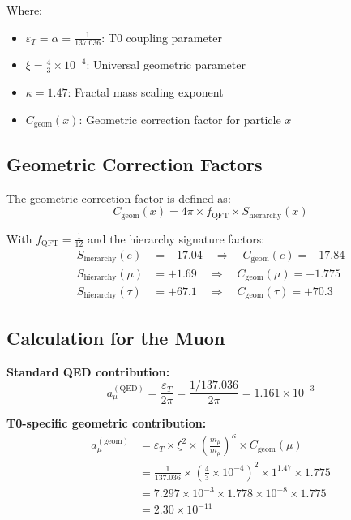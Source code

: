 \documentclass[12pt,a4paper]{article}
\begin{document}
Where:
\begin{itemize}
	\item $\varepsilon_T = \alpha = \frac{1}{137.036}$: T0 coupling parameter
	\item $\xi = \frac{4}{3} \times 10^{-4}$: Universal geometric parameter
	\item $\kappa = 1.47$: Fractal mass scaling exponent
	\item $C_{\text{geom}}(x)$: Geometric correction factor for particle $x$
\end{itemize}

\subsection{Geometric Correction Factors}

The geometric correction factor is defined as:
\begin{equation}
	C_{\text{geom}}(x) = 4\pi \times f_{\text{QFT}} \times S_{\text{hierarchy}}(x)
\end{equation}

With $f_{\text{QFT}} = \frac{1}{12}$ and the hierarchy signature factors:
\begin{align}
	S_{\text{hierarchy}}(e) &= -17.04 \quad \Rightarrow \quad C_{\text{geom}}(e) = -17.84\\
	S_{\text{hierarchy}}(\mu) &= +1.69 \quad \Rightarrow \quad C_{\text{geom}}(\mu) = +1.775\\
	S_{\text{hierarchy}}(\tau) &= +67.1 \quad \Rightarrow \quad C_{\text{geom}}(\tau) = +70.3
\end{align}

\subsection{Calculation for the Muon}

\textbf{Standard QED contribution:}
\begin{equation}
	a_\mu^{(\text{QED})} = \frac{\varepsilon_T}{2\pi} = \frac{1/137.036}{2\pi} = 1.161 \times 10^{-3}
\end{equation}

\textbf{T0-specific geometric contribution:}
\begin{align}
	a_\mu^{(\text{geom})} &= \varepsilon_T \times \xi^2 \times \left(\frac{m_\mu}{m_\mu}\right)^\kappa \times C_{\text{geom}}(\mu)\\
	&= \frac{1}{137.036} \times \left(\frac{4}{3} \times 10^{-4}\right)^2 \times 1^{1.47} \times 1.775\\
	&= 7.297 \times 10^{-3} \times 1.778 \times 10^{-8} \times 1.775\\
	&= 2.30 \times 10^{-11}
\end{align}
\end{document}
